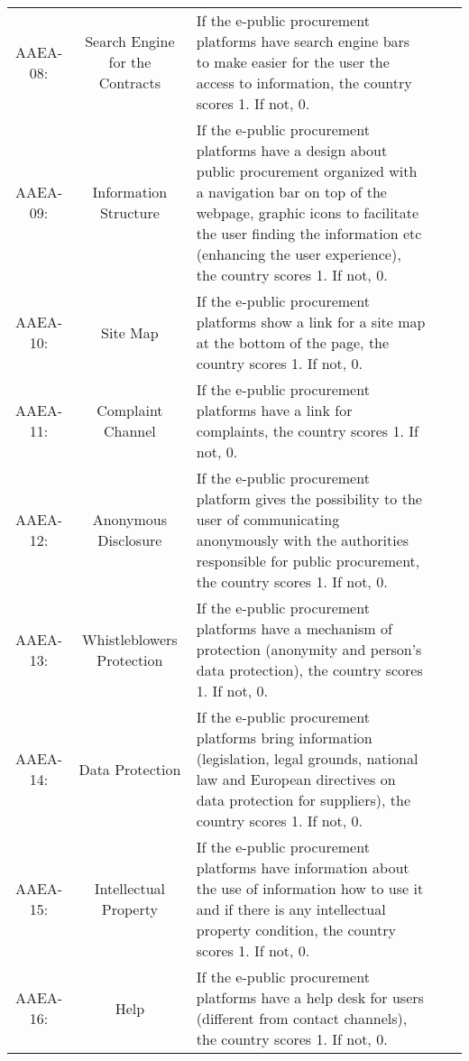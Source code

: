 \documentclass[a4paper, twoside]{report}
\begin{document}
\begin{table}[htbp]
\begin{adjustbox}{max width=\linewidth}
\begin{tabular}{ccp{30em}p{30em}p{21.335em}}
    AAEA-08: & Search Engine for the Contracts & If the e-public procurement platforms have search engine bars to make easier for the user the access to information, the country scores 1. If not, 0. \\
    AAEA-09: & Information Structure & If the e-public procurement platforms have a design about public procurement organized with a navigation bar on top of the webpage, graphic icons to facilitate the user finding the information etc (enhancing the user experience), the country scores 1. If not, 0. \\
    AAEA-10: & Site Map & If the e-public procurement platforms show a link for a site map at the bottom of the page, the country scores 1. If not, 0. \\
    AAEA-11: & Complaint Channel & If the e-public procurement platforms have a link for complaints, the country scores 1. If not, 0. \\
    AAEA-12: & \cellcolor[rgb]{ .749,  .749,  .749}Anonymous Disclosure & \cellcolor[rgb]{ .749,  .749,  .749}If the e-public procurement platform gives the possibility to the user of communicating anonymously with the authorities responsible for public procurement, the country scores 1. If not, 0. \\
    AAEA-13: & Whistleblowers Protection & If the e-public procurement platforms have a mechanism of protection (anonymity and person’s data protection), the country scores 1. If not, 0. \\
    AAEA-14: & Data Protection & If the e-public procurement platforms bring information (legislation, legal grounds, national law and European directives on data protection for suppliers), the country scores 1. If not, 0. \\
    AAEA-15: & Intellectual Property & If the e-public procurement platforms have information about the use of information how to use it and if there is any intellectual property condition, the country scores 1. If not, 0. \\
    AAEA-16: & Help  & If the e-public procurement platforms have a help desk for users (different from contact channels), the country scores 1. If not, 0. \\
    \bottomrule
    \end{tabular}%
    \end{adjustbox}
  \label{tab:definitions2}%
\end{table}%
\end{document}
